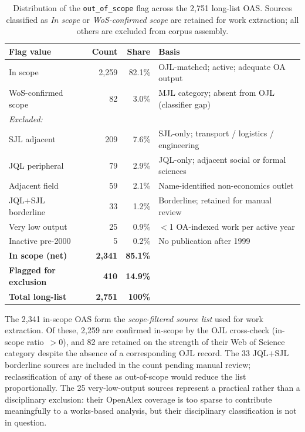 \begin{table}[ht]
\centering
\caption{Distribution of the \texttt{out\_of\_scope} flag across the 2{,}751
         long-list OAS. Sources classified as \textit{In scope} or
         \textit{WoS-confirmed scope} are retained for work extraction;
         all others are excluded from corpus assembly.}
\label{tab:scope_flags}
\small
\begin{tabular}{lrrl}
\toprule
\textbf{Flag value} & \textbf{Count} & \textbf{Share} & \textbf{Basis} \\
\midrule
In scope            & 2{,}259 & 82.1\% & OJL-matched; active; adequate OA output \\
WoS-confirmed scope &      82 &  3.0\% & MJL category; absent from OJL (classifier gap) \\
\midrule
\textit{Excluded:} \\
SJL adjacent        &   209   &  7.6\% & SJL-only; transport / logistics / engineering \\
JQL peripheral      &    79   &  2.9\% & JQL-only; adjacent social or formal sciences \\
Adjacent field      &    59   &  2.1\% & Name-identified non-economics outlet \\
JQL$+$SJL borderline&    33   &  1.2\% & Borderline; retained for manual review \\
Very low output     &    25   &  0.9\% & $<$1 OA-indexed work per active year \\
Inactive pre-2000   &     5   &  0.2\% & No publication after 1999 \\
\midrule
\textbf{In scope (net)} & \textbf{2{,}341} & \textbf{85.1\%} & \\
\textbf{Flagged for exclusion} & \textbf{410} & \textbf{14.9\%} & \\
\midrule
\textbf{Total long-list} & \textbf{2{,}751} & \textbf{100\%} & \\
\bottomrule
\end{tabular}
\end{table}

The 2{,}341 in-scope OAS form the \textit{scope-filtered source list} used for
work extraction.
Of these, 2{,}259 are confirmed in-scope by the OJL cross-check
(in-scope ratio~$>0$), and 82 are retained on the strength of their Web of Science
category despite the absence of a corresponding OJL record.
The 33 JQL$+$SJL borderline sources are included in the count pending manual review;
reclassification of any of these as out-of-scope would reduce the list proportionally.
The 25 very-low-output sources represent a practical rather than a disciplinary
exclusion: their OpenAlex coverage is too sparse to contribute meaningfully
to a works-based analysis, but their disciplinary classification is not in question.

